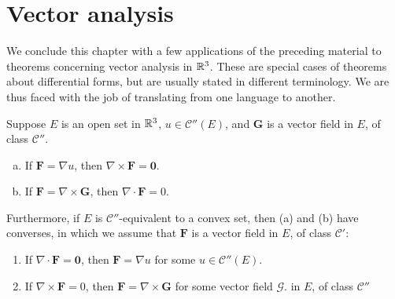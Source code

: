 
\section{Vector analysis}

We conclude this chapter with a few applications of the preceding material to theorems concerning vector analysis in ${\protect\mathbb R}^3$. 
These are special cases of theorems about differential forms, but are usually stated in different terminology. 
We are thus faced with the job of translating from one language to another.

\begin{mydef}

\end{mydef}

\begin{thm}
    \label{thm:10.43}
    Suppose $E$ is an open set in ${\protect\mathbb R}^3$, $u \in \mathscr{C}''(E)$, and $\mathbf{G}$ is a vector field in $E$, of class $\mathscr{C}''$.
    \begin{enumerate}[(a)]
        \item If $\mathbf{F} = \nabla u$, then $\nabla \times \mathbf{F} = \mathbf{0}$.
        \item If $\mathbf{F} = \nabla \times \mathbf{G}$, then $\nabla \cdot \mathbf{F} = 0$.
    \end{enumerate}

    Furthermore, if $E$ is $\mathscr{C}''$-equivalent to a convex set, 
    then (a) and (b) have converses, 
    in which we assume that $\mathbf{F}$ is a vector field in $E$, of class $\mathscr{C}'$:
    \begin{enumerate}[(a')]
        \item If $\nabla \cdot \mathbf{F} = \mathbf{0}$, then $\mathbf{F} = \nabla u$ for some $u \in \mathscr{C}''(E)$.
        \item If $\nabla \times \mathbf{F} = 0$, then $\mathbf{F} = \nabla \times \mathbf{G}$ for some vector field $\mathscr{G}$. in $E$, of class $\mathscr{C}''$
    \end{enumerate}
\end{thm}

\begin{mydef}

\end{mydef}

\begin{mydef}
    
\end{mydef}



